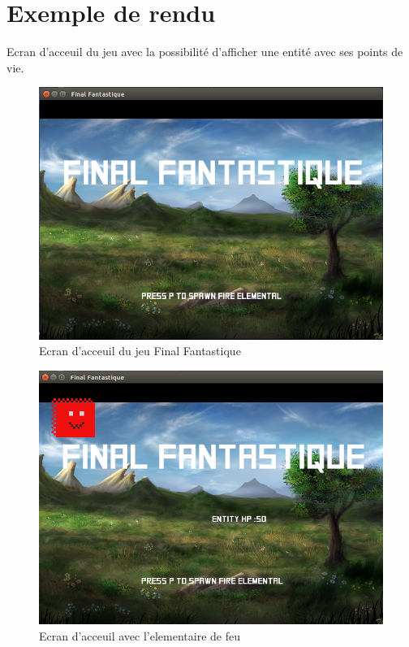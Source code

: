 \documentclass[12pt,a4paper]{report}
\begin{document}
\section{Exemple de rendu}

Ecran d'acceuil du jeu avec la possibilité d'afficher une entité avec ses points de vie.

\begin{figure}
\caption{Ecran d'acceuil du jeu Final Fantastique}
\includegraphics[width=1\textwidth]{Ecran_acceuil_ff.png}
\end{figure}

\begin{figure}
\caption{Ecran d'acceuil avec l'elementaire de feu}
\includegraphics[width=1\textwidth]{Ecran_acceuil_fire_elemental.png}
\end{figure}
\end{document}
